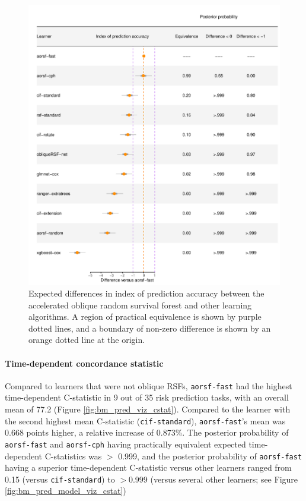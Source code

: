 \documentclass[12pt]{article}\usepackage[]{graphicx}\usepackage[]{xcolor}
\makeatletter
\def\maxwidth{ %
  \ifdim\Gin@nat@width>\linewidth
    \linewidth
  \else
    \Gin@nat@width
  \fi
}
\newenvironment{knitrout}{}{} %
\makeatother
\begin{document}
\begin{knitrout}
\color{fgcolor}\begin{figure}
\includegraphics[width=\maxwidth]{figure/bm_pred_model_viz_ibs-1} \caption[Expected differences in index of prediction accuracy between the accelerated oblique random survival forest and other learning algorithms]{Expected differences in index of prediction accuracy between the accelerated oblique random survival forest and other learning algorithms. A region of practical equivalence is shown by purple dotted lines, and a boundary of non-zero difference is shown by an orange dotted line at the origin.}\label{fig:bm_pred_model_viz_ibs}
\end{figure}

\end{knitrout}

\paragraph{Time-dependent concordance statistic}




Compared to learners that were not oblique RSFs, \texttt{aorsf-fast} had the highest time-dependent C-statistic in 9 out of 35 risk prediction tasks, with an overall mean of 77.2 (Figure \ref{fig:bm_pred_viz_cstat}). Compared to the learner with the second highest mean C-statistic (\texttt{cif-standard}), \texttt{aorsf-fast}'s mean was 0.668 points higher, a relative increase of 0.873\%. The posterior probability of \texttt{aorsf-fast} and \texttt{aorsf-cph} having practically equivalent expected time-dependent C-statistics was $>$ 0.999, and the posterior probability of \texttt{aorsf-fast} having a superior time-dependent C-statistic versus other learners ranged from 0.15 (versus \texttt{cif-standard}) to $>$0.999 (versus several other learners; see Figure \ref{fig:bm_pred_model_viz_cstat})
\end{document}
